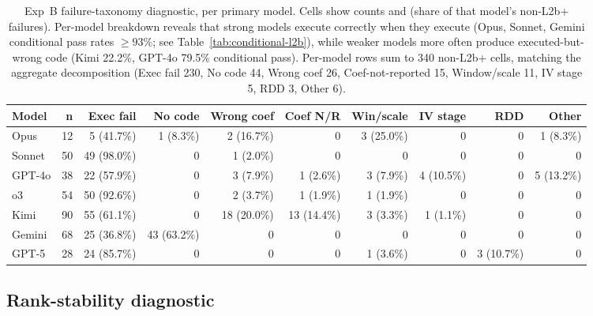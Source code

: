 \documentclass{article}
\begin{document}
\begin{table}[h]
\centering
\caption{Exp~B failure-taxonomy diagnostic, per primary model. Cells show counts
and (share of that model's non-L2b+ failures). Per-model breakdown reveals that
strong models execute correctly when they execute (Opus, Sonnet, Gemini conditional
pass rates $\ge 93\%$; see Table~\ref{tab:conditional-l2b}), while weaker models
more often produce executed-but-wrong code (Kimi 22.2\%, GPT-4o 79.5\% conditional
pass). Per-model rows sum to 340 non-L2b+ cells, matching the aggregate decomposition
(Exec fail 230, No code 44, Wrong coef 26, Coef-not-reported 15, Window/scale 11,
IV stage 5, RDD 3, Other 6).}
\label{tab:failure-taxonomy}
\scriptsize
\setlength{\tabcolsep}{3.0pt}
\renewcommand{\arraystretch}{1.05}
\begin{tabular}{lrrrrrrrrr}
\toprule
\textbf{Model} & \textbf{n} & \textbf{Exec fail} & \textbf{No code} &
\textbf{Wrong coef} & \textbf{Coef N/R} & \textbf{Win/scale} &
\textbf{IV stage} & \textbf{RDD} & \textbf{Other} \\
\midrule
Opus   & 12 & 5 (41.7\%)  & 1 (8.3\%)   & 2 (16.7\%)  & 0           & 3 (25.0\%) & 0          & 0          & 1 (8.3\%) \\
Sonnet & 50 & 49 (98.0\%) & 0           & 1 (2.0\%)   & 0           & 0          & 0          & 0          & 0 \\
GPT-4o & 38 & 22 (57.9\%) & 0           & 3 (7.9\%)   & 1 (2.6\%)   & 3 (7.9\%)  & 4 (10.5\%) & 0          & 5 (13.2\%) \\
o3     & 54 & 50 (92.6\%) & 0           & 2 (3.7\%)   & 1 (1.9\%)   & 1 (1.9\%)  & 0          & 0          & 0 \\
Kimi   & 90 & 55 (61.1\%) & 0           & 18 (20.0\%) & 13 (14.4\%) & 3 (3.3\%)  & 1 (1.1\%)  & 0          & 0 \\
Gemini & 68 & 25 (36.8\%) & 43 (63.2\%) & 0           & 0           & 0          & 0          & 0          & 0 \\
GPT-5  & 28 & 24 (85.7\%) & 0           & 0           & 0           & 1 (3.6\%)  & 0          & 3 (10.7\%) & 0 \\
\bottomrule
\end{tabular}
\end{table}

\subsection{Rank-stability diagnostic}
\label{app:rank_stability}
\end{document}
